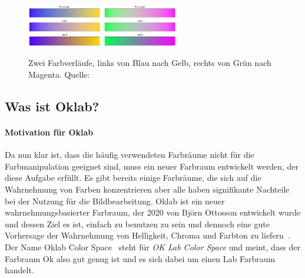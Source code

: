 \documentclass[12pt, a4paper, ngerman]{article}
\begin{document}
\begin{figure}
  \centering
  \includegraphics[width=0.29\textwidth]{Grafiken/Farbverlauf/blueyellow.png}
  \includegraphics[width=0.29\textwidth]{Grafiken/Farbverlauf/greenmagenta.png}
  \caption{Zwei Farbverläufe, links von Blau nach Gelb, rechts von Grün nach Magenta. Quelle:~\cite{Ottosson_2020}}
  \label{fig:vergleich_zweifarbig}
\end{figure}

\subsection{Was ist Oklab?}

\paragraph{Motivation für Oklab}
Da nun klar ist, dass die häufig verwendeten Farbräume nicht für die Farbmanipulation geeignet sind, 
muss ein neuer Farbraum entwickelt werden, der diese Aufgabe erfüllt.
Es gibt bereits einige Farbräume, die sich auf die Wahrnehmung von Farben konzentrieren 
aber alle haben signifikante Nachteile bei der Nutzung für die Bildbearbeitung.
\acs{Oklab} ist ein neuer wahrnehmungsbasierter Farbraum, der 2020 von Björn Ottosson entwickelt wurde und 
dessen Ziel es ist, einfach zu benutzen zu sein und dennoch eine gute Vorhersage 
der  Wahrnehmung von Helligkeit, Chroma und Farbton zu liefern~\cite{Oklab_2020}.
Der Name \glqq Oklab Color Space\grqq~ steht für \emph{OK Lab Color Space} und meint, 
dass der Farbraum Ok also gut genug ist und es sich dabei um einen Lab Farbraum handelt.
\end{document}
